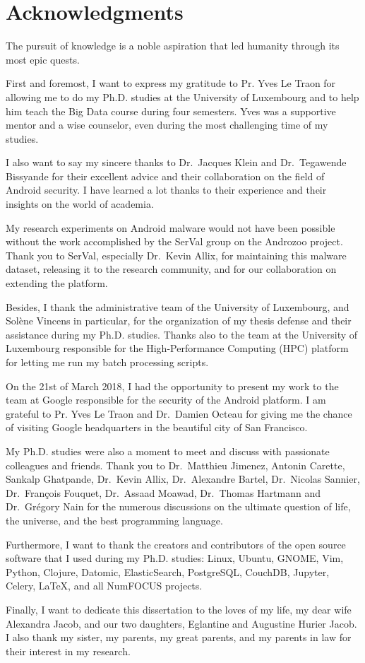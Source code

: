 \chapter*{Acknowledgments}
The pursuit of knowledge is a noble aspiration that led humanity through its most epic quests.  

First and foremost, I want to express my gratitude to Pr. Yves Le Traon for allowing me to do my Ph.D. studies at the University of Luxembourg and to help him teach the Big Data course during four semesters.
Yves was a supportive mentor and a wise counselor, even during the most challenging time of my studies.

I also want to say my sincere thanks to Dr.\ Jacques Klein and Dr.\ Tegawende Bissyande for their excellent advice and their collaboration on the field of Android security.
I have learned a lot thanks to their experience and their insights on the world of academia.

My research experiments on Android malware would not have been possible without the work accomplished by the SerVal group on the Androzoo project.
Thank you to SerVal, especially Dr.\ Kevin Allix, for maintaining this malware dataset, releasing it to the research community, and for our collaboration on extending the platform.

Besides, I thank the administrative team of the University of Luxembourg, and Solène Vincens in particular, for the organization of my thesis defense and their assistance during my Ph.D. studies.
Thanks also to the team at the University of Luxembourg responsible for the High-Performance Computing (HPC) platform for letting me run my batch processing scripts.

On the 21st of March 2018, I had the opportunity to present my work to the team at Google responsible for the security of the Android platform.
I am grateful to Pr. Yves Le Traon and Dr.\ Damien Octeau for giving me the chance of visiting Google headquarters in the beautiful city of San Francisco. 

My Ph.D. studies were also a moment to meet and discuss with passionate colleagues and friends.
Thank you to Dr.\ Matthieu Jimenez, Antonin Carette, Sankalp Ghatpande, Dr.\ Kevin Allix, Dr.\ Alexandre Bartel, Dr.\ Nicolas Sannier, Dr.\ François Fouquet, Dr.\ Assaad Moawad, Dr.\ Thomas Hartmann and Dr.\ Grégory Nain for the numerous discussions on the ultimate question of life, the universe, and the best programming language.

Furthermore, I want to thank the creators and contributors of the open source software that I used during my Ph.D. studies: Linux, Ubuntu, GNOME, Vim, Python, Clojure, Datomic, ElasticSearch, PostgreSQL, CouchDB, Jupyter, Celery, \LaTeX{}, and all NumFOCUS projects. 

Finally, I want to dedicate this dissertation to the loves of my life, my dear wife Alexandra Jacob, and our two daughters, Eglantine and Augustine Hurier Jacob.
I also thank my sister, my parents, my great parents, and my parents in law for their interest in my research.
